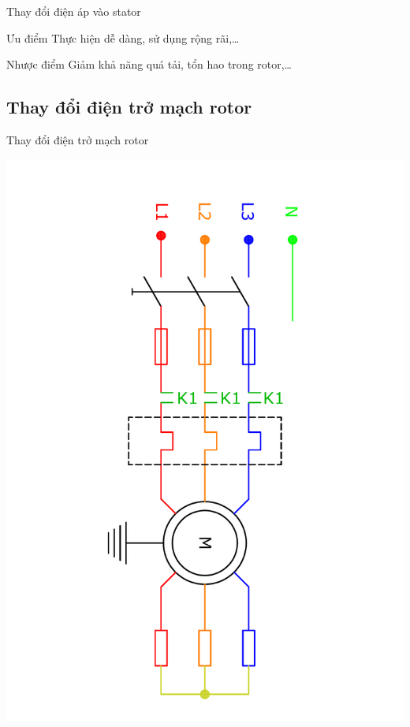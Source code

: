 \documentclass[20pt]{beamer}
\begin{document}
\begin{frame}{Thay đổi điện áp vào stator}
	\begin{block}{Ưu điểm}
		\justifying
		Thực hiện dễ dàng, sử dụng rộng rãi,\ldots
   \end{block}
   
   \begin{block}{Nhược điểm}
   		\justifying
   		Giảm khả năng quá tải, tổn hao trong rotor,\ldots
   \end{block}
\end{frame}

\subsection*{Thay đổi điện trở mạch rotor}
\begin{frame}{Thay đổi điện trở mạch rotor}
	\vspace{-2.5cm}
	\begin{center}
		\includegraphics[scale=0.4, angle = 90]{../sodomach/dieu-chinh-dien-tro-rotor.pdf}
	\end{center}
\end{frame}
\end{document}
